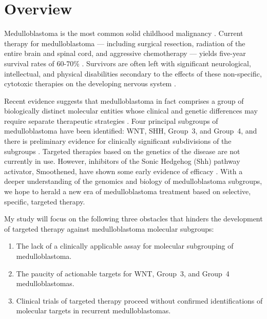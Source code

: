 \documentclass[11pt,letterpaper]{article}
\theoremstyle{definition}
\begin{document}


\section{Overview}

Medulloblastoma is the most common solid childhood malignancy . Current therapy for medulloblastoma --- including surgical resection, radiation of the entire brain and spinal cord, and aggressive chemotherapy --- yields five-year survival rates of 60-70\% . Survivors are often left with significant neurological, intellectual, and physical disabilities secondary to the effects of these non-specific, cytotoxic therapies on the developing nervous system .

Recent evidence suggests that medulloblastoma in fact comprises a group of biologically distinct molecular entities whose clinical and genetic differences may require separate therapeutic strategies . Four principal subgroups of medulloblastoma have been identified: WNT, SHH, Group~3, and Group~4, and there is preliminary evidence for clinically significant subdivisions of the subgroups . Targeted therapies based on the genetics of the disease are not currently in use. However, inhibitors of the Sonic Hedgehog (Shh) pathway activator, Smoothened, have shown some early evidence of efficacy . With a deeper understanding of the genomics and biology of medulloblastoma subgroups, we hope to herald a new era of medulloblastoma treatment based on selective, specific, targeted therapy.

My study will focus on the following three obstacles that hinders the development of targeted therapy against medulloblastoma molecular subgroups:

\begin{enumerate}
	\item The lack of a clinically applicable assay for molecular subgrouping of medulloblastoma.
	\item The paucity of actionable targets for WNT, Group~3, and Group~4 medulloblastomas.
	\item Clinical trials of targeted therapy proceed without confirmed identifications of molecular targets in recurrent medulloblastomas.
\end{enumerate}
\end{document}
